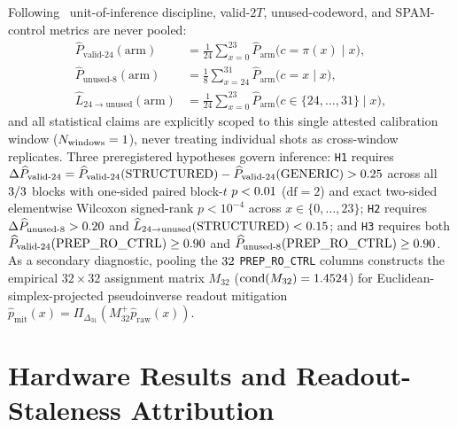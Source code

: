 \documentclass[aps,prx,twocolumn,superscriptaddress,nofootinbib]{revtex4-2}
\begin{document}
Following \btCardId\ unit-of-inference discipline, valid-$2T$, unused-codeword, and SPAM-control metrics are never pooled:
\begin{align}
  \widehat{P}_{\mathrm{valid\text{-}24}}(\mathrm{arm}) &= \frac{1}{24}\sum_{x=0}^{23} \widehat{P}_{\mathrm{arm}}\bigl(c = \pi(x) \mid x\bigr), \nonumber\\
  \widehat{P}_{\mathrm{unused\text{-}8}}(\mathrm{arm}) &= \frac{1}{8}\sum_{x=24}^{31} \widehat{P}_{\mathrm{arm}}\bigl(c = x \mid x\bigr), \nonumber\\
  \widehat{L}_{24\to\mathrm{unused}}(\mathrm{arm}) &= \frac{1}{24}\sum_{x=0}^{23} \widehat{P}_{\mathrm{arm}}\bigl(c \in \{24,\dots,31\} \mid x\bigr),
  \label{eq:metrics}
\end{align}
and all statistical claims are explicitly scoped to this single attested calibration window ($N_{\mathrm{windows}} = 1$), never treating individual shots as cross-window replicates. Three preregistered hypotheses govern inference: \texttt{H1} requires $\Delta\widehat{P}_{\mathrm{valid\text{-}24}} = \widehat{P}_{\mathrm{valid\text{-}24}}(\mathrm{STRUCTURED}) - \widehat{P}_{\mathrm{valid\text{-}24}}(\mathrm{GENERIC}) > 0.25$ across all $3 / 3$ blocks with one-sided paired block-$t$ $p < 0.01$ ($\mathrm{df}=2$) and exact two-sided elementwise Wilcoxon signed-rank $p < 10^{-4}$ across $x \in \{0,\dots,23\}$; \texttt{H2} requires $\Delta\widehat{P}_{\mathrm{unused\text{-}8}} > 0.20$ and $\widehat{L}_{24\to\mathrm{unused}}(\mathrm{STRUCTURED}) < 0.15$; and \texttt{H3} requires both $\widehat{P}_{\mathrm{valid\text{-}24}}(\mathrm{PREP\_RO\_CTRL}) \ge 0.90$ and $\widehat{P}_{\mathrm{unused\text{-}8}}(\mathrm{PREP\_RO\_CTRL}) \ge 0.90$. As a secondary diagnostic, pooling the $32$ \texttt{PREP\_RO\_CTRL} columns constructs the empirical $32\times 32$ assignment matrix $M_{32}$ ($\mathrm{cond}(M_{32}) = 1.4524$) for Euclidean-simplex-projected pseudoinverse readout mitigation $\widehat{p}_{\mathrm{mit}}(x) = \Pi_{\Delta_{31}}(M_{32}^+ \widehat{p}_{\mathrm{raw}}(x))$.

\section{Hardware Results and Readout-Staleness Attribution}
\end{document}
